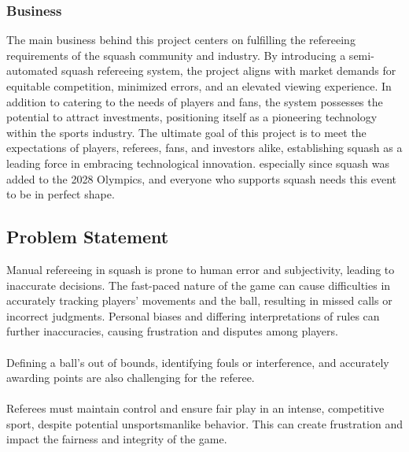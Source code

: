 \documentclass[12pt]{article}
\begin{document}
\subsubsection{Business}
The main business behind this project centers on fulfilling the refereeing requirements of the squash community and industry. By introducing a semi-automated squash refereeing system, the project aligns with market demands for equitable competition, minimized errors, and an elevated viewing experience. In addition to catering to the needs of players and fans, the system possesses the potential to attract investments, positioning itself as a pioneering technology within the sports industry. The ultimate goal of this project is to meet the expectations of players, referees, fans, and investors alike, establishing squash as a leading force in embracing technological innovation. especially since squash was added to the 2028 Olympics, and everyone who supports squash needs this event to be in perfect shape.

\subsection{Problem Statement}
Manual refereeing in squash is prone to human error and subjectivity, leading to inaccurate decisions. The fast-paced nature of the game can cause difficulties in accurately tracking players' movements and the ball, resulting in missed calls or incorrect judgments. Personal biases and differing interpretations of rules can further inaccuracies, causing frustration and disputes among players.
\cite{TechAndHuman}\\\\
Defining a ball's out of bounds, identifying fouls or interference, and accurately awarding points are also challenging for the referee.\\\\
Referees must maintain control and ensure fair play in an intense, competitive sport, despite potential unsportsmanlike behavior. This can create frustration and impact the fairness and integrity of the game.\\
\end{document}

